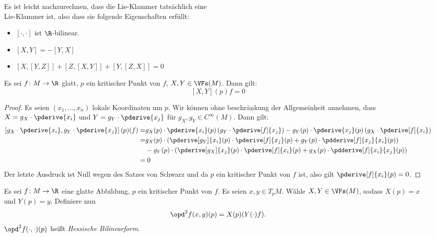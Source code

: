 \begin{remark}
    Es ist leicht nachzurechnen, dass die Lie-Klammer tatsächlich eine \\ Lie-Klammer ist,
    also dass sie folgende Eigenschaften erfüllt:
    \begin{itemize}
        \item $[\cdot, \cdot]$ ist $\R$-bilinear.
        \item $[X, Y] = -[Y, X]$
        \item $[X, [Y, Z]] + [Z, [X, Y]] + [Y, [Z, X]] = 0$
    \end{itemize}
\end{remark}

\begin{prop}
    \label{prop: lie-klammer ist null}
    Es sei $f \colon M \to \R$ glatt, $p$ ein kritischer Punkt von $f$, 
    $X, Y \in \VFs (M)$. Dann gilt:
    \[ [X, Y] (p) f = 0 \]
\end{prop}

\begin{proof}
    Es seien $(x_1, ..., x_n)$ lokale Koordinaten um $p$. Wir können ohne beschränkung
    der Allgemeinheit annehmen, dass $X = g_X \cdot \pderive{x_i}$ und 
    $Y = g_Y \cdot \pderive{x_j}$ für $g_X, g_Y \in C^{\infty} (M)$. Dann gilt:
    \begin{align*}
        \left[g_X \cdot \pderive{x_i}, g_Y \cdot \pderive{x_j}\right] (p) (f) = & 
            g_X (p) \cdot \pderive{x_i} (p) \left(g_Y \cdot \pderive[f]{x_j} \right) -
            g_Y (p) \cdot \pderive{x_j} (p) \left(g_X \cdot \pderive[f]{x_i} \right) \\
        = & g_X (p) \cdot \left( \pderive[g_Y]{x_i}(p) \cdot \pderive[f]{x_j}(p) + 
                g_Y(p) \cdot \pdderive[f]{x_j}{x_i}(p) \right) \\ 
        & - g_Y (p) \cdot \left( \pderive[g_X]{x_j}(p) \cdot \pderive[f]{x_i}(p) + 
            g_X (p) \cdot \pdderive[f]{x_i}{x_j}(p) \right) \\
        = & \; 0
    \end{align*}
    Der letzte Ausdruck ist Null wegen des Satzes von Schwarz und da $p$ ein kritischer
    Punkt von $f$ ist, also gilt $\pderive[f]{x_i}(p) = 0$.
\end{proof}

\begin{definition}
    Es sei $f \colon M \to \R$ eine glatte Abbildung, $p$ ein kritischer Punkt von $f$.
    Es seien $x, y \in T_pM$. Wähle $X, Y \in \VFs (M)$, sodass $X(p) = x$ und 
    $Y(p) = y$. Definiere nun
    \[ \opd^2 f (x, y) (p) = X(p)(Y(\cdot)f). \]
    $\opd^2 f (\cdot, \cdot) (p)$ heißt \textit{Hessische Bilinearform}. 
\end{definition}

